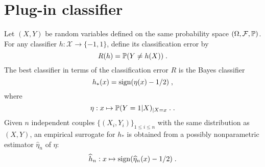 \section{Plug-in classifier}
Let $(X,Y)$ be random variables defined on the same probability space $(\Omega,\mathcal{F},\mathbb{P})$.
For any classifier $h:\mathcal{X}\to \{-1,1\}$, define its classification error by
\[
R(h)=\mathbb{P}(Y\neq h(X))\;.
\]
The best classifier in terms of the classification error $R$ is the Bayes classifier
\[
h_{*}(x)={\rm sign}(\eta(x)-1/2)\;,
\]
where
\[
\eta:x \mapsto\mathbb{P}(Y=1|X)_{|X=x}\;.\;.
\]
Given $n$ independent couples $\{(X_i,Y_i)\}_{1\leqslant i \leqslant n}$ with the same distribution as $(X,Y)$, an empirical surrogate for $h_{*}$ is obtained from a possibly nonparametric estimator $\widehat \eta_n$ of $\eta$:
\[
\widehat h_n: x\mapsto {\rm sign}(\widehat \eta_n(x)-1/2)\;.
\]
